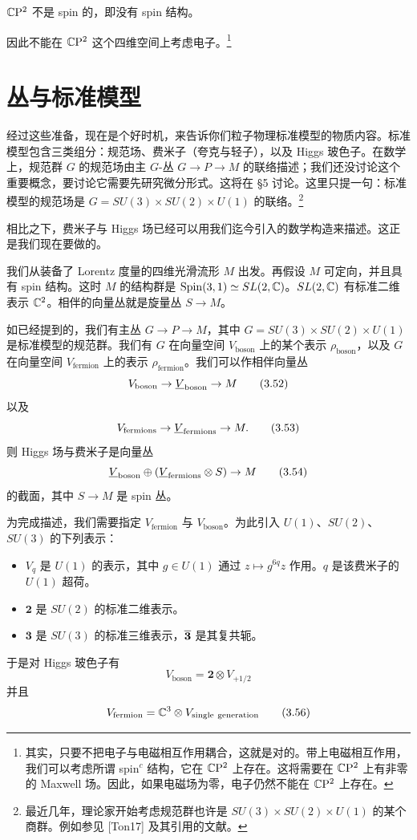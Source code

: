 \begin{qmbox}
 $\mathbb{C}\mathrm{P}^2$ 不是 spin 的，即没有 spin 结构。
\end{qmbox}

因此不能在 $\mathbb{C}\mathrm{P}^2$ 这个四维空间上考虑电子。\footnote{其实，只要不把电子与电磁相互作用耦合，这就是对的。带上电磁相互作用，我们可以考虑所谓 spin$^c$ 结构，它在 $\mathbb{C}\mathrm{P}^2$ 上存在。这将需要在 $\mathbb{C}\mathrm{P}^2$ 上有非零的 Maxwell 场。因此，如果电磁场为零，电子仍然不能在 $\mathbb{C}\mathrm{P}^2$ 上存在。}


\section{丛与标准模型}

经过这些准备，现在是个好时机，来告诉你们粒子物理标准模型的物质内容。标准模型包含三类组分：规范场、费米子（夸克与轻子），以及 Higgs 玻色子。在数学上，规范群 $G$ 的规范场由主 $G$-丛 $G\to P\to M$ 的联络描述；我们还没讨论这个重要概念，要讨论它需要先研究微分形式。这将在 §5 讨论。这里只提一句：标准模型的规范场是 $G=SU(3)\times SU(2)\times U(1)$ 的联络。\footnote{最近几年，理论家开始考虑规范群也许是 $SU(3)\times SU(2)\times U(1)$ 的某个商群。例如参见 [Ton17] 及其引用的文献。}

相比之下，费米子与 Higgs 场已经可以用我们迄今引入的数学构造来描述。这正是我们现在要做的。

我们从装备了 Lorentz 度量的四维光滑流形 $M$ 出发。再假设 $M$ 可定向，并且具有 spin 结构。这时 $M$ 的结构群是 $\mathrm{Spin}(3,1)\simeq SL(2,\mathbb{C})$。$SL(2,\mathbb{C})$ 有标准二维表示 $\mathbb{C}^2$。相伴的向量丛就是旋量丛 $S\to M$。

如已经提到的，我们有主丛 $G\to P\to M$，其中 $G=SU(3)\times SU(2)\times U(1)$ 是标准模型的规范群。我们有 $G$ 在向量空间 $V_{\mathrm{boson}}$ 上的某个表示 $\rho_{\mathrm{boson}}$，以及 $G$ 在向量空间 $V_{\mathrm{fermion}}$ 上的表示 $\rho_{\mathrm{fermion}}$。我们可以作相伴向量丛
\[
V_{\mathrm{boson}}\to\underline{V}_{\mathrm{boson}}\to M
\tag{3.52}
\]
以及
\[
V_{\mathrm{fermions}}\to\underline{V}_{\mathrm{fermions}}\to M.
\tag{3.53}
\]
则 Higgs 场与费米子是向量丛
\[
\underline{V}_{\mathrm{boson}}\oplus(\underline{V}_{\mathrm{fermions}}\otimes S)\to M
\tag{3.54}
\]
的截面，其中 $S\to M$ 是 spin 丛。

为完成描述，我们需要指定 $V_{\mathrm{fermion}}$ 与 $V_{\mathrm{boson}}$。为此引入 $U(1)$、$SU(2)$、$SU(3)$ 的下列表示：
\begin{itemize}
  \item $V_q$ 是 $U(1)$ 的表示，其中 $g\in U(1)$ 通过 $z\mapsto g^{6q}z$ 作用。$q$ 是该费米子的 $U(1)$ 超荷。
  \item $\mathbf{2}$ 是 $SU(2)$ 的标准二维表示。
  \item $\mathbf{3}$ 是 $SU(3)$ 的标准三维表示，$\overline{\mathbf{3}}$ 是其复共轭。
\end{itemize}
于是对 Higgs 玻色子有
\[
V_{\mathrm{boson}}=\mathbf{2}\otimes V_{+1/2}
\tag{3.55}
\]
并且
\[
V_{\mathrm{fermion}}=\mathbb{C}^3\otimes V_{\mathrm{single\ generation}}
\tag{3.56}
\]

